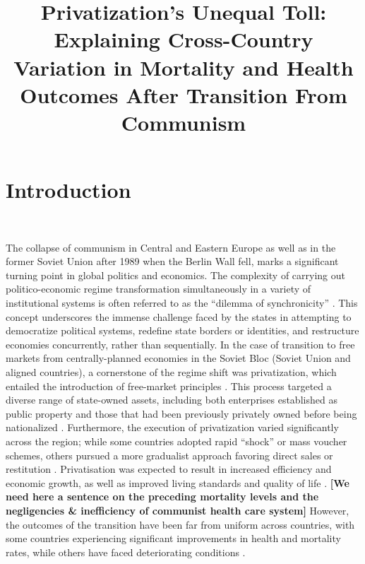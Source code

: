 \documentclass[12pt]{article}
\title{\normalsize{\textbf{\Large{Privatization’s Unequal Toll: Explaining Cross-Country
Variation in Mortality and Health Outcomes After Transition From Communism}}} }
\date{\vspace{-5ex}}
\begin{document}
\begin{titlingpage}


\maketitle



\end{titlingpage}

\clearpage


\section{Introduction}\

The collapse of communism in Central and Eastern Europe as well as in the former Soviet Union after 1989 when the Berlin Wall fell, 
marks a significant turning point in global politics and economics. The complexity of carrying out politico-economic regime transformation simultaneously 
in a variety of institutional systems is often referred to as the ``dilemma of synchronicity'' \citep{A_Ramet2010}. This concept underscores 
the immense challenge faced by the states in attempting to democratize political systems, redefine state borders or identities, 
and restructure economies concurrently, rather than sequentially. In the case of transition to free markets from centrally-planned economies in the Soviet Bloc (Soviet Union and aligned countries), a cornerstone of the regime shift was privatization, 
which entailed the introduction of free-market principles \citep{Estrin2004}. This process targeted a diverse range 
of state-owned assets, including both enterprises established as public property and those that had been previously privately owned before being 
nationalized \citep{A_Ramet2010}. Furthermore, the execution of privatization varied significantly across the region; while some countries 
adopted rapid ``shock'' or mass voucher schemes, others pursued a more gradualist approach favoring direct sales or restitution 
\citep{Soos1997, Rohac2016}. Privatisation was expected to result in increased efficiency and economic growth, as well as improved living standards and quality of life 
\citep{Cornia2016}. \textbf{[We need here a sentence on the preceding mortality levels and the negligencies & inefficiency of communist health care system]} However, the outcomes of the transition have been far from uniform across countries, with some countries experiencing 
significant improvements in health and mortality rates, while others have faced deteriorating conditions \citep{B_Brainerd1998}.
\end{document}
